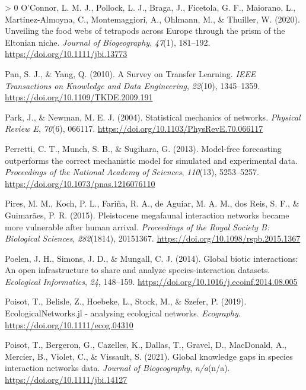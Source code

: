 \documentclass[10pt,oneside]{article}
\newlength{\cslhangindent}
\newenvironment{CSLReferences}[3] %
 {%
  \setlength{\parindent}{0pt}
  \ifodd #1 \everypar{\setlength{\hangindent}{\cslhangindent}}\ignorespaces\fi
  \ifnum #2 > 0
  \setlength{\parskip}{#2\baselineskip}
  \fi
 }%
 {}
\begin{document}
\begin{CSLReferences}{1}{0}
\leavevmode\hypertarget{ref-OConnor2020UnvFoo}{}%
O'Connor, L. M. J., Pollock, L. J., Braga, J., Ficetola, G. F.,
Maiorano, L., Martinez-Almoyna, C., Montemaggiori, A., Ohlmann, M., \&
Thuiller, W. (2020). Unveiling the food webs of tetrapods across Europe
through the prism of the Eltonian niche. \emph{Journal of Biogeography},
\emph{47}(1), 181--192. \url{https://doi.org/10.1111/jbi.13773}

\leavevmode\hypertarget{ref-Pan2010SurTra}{}%
Pan, S. J., \& Yang, Q. (2010). A Survey on Transfer Learning.
\emph{IEEE Transactions on Knowledge and Data Engineering},
\emph{22}(10), 1345--1359. \url{https://doi.org/10.1109/TKDE.2009.191}

\leavevmode\hypertarget{ref-Park2004StaMec}{}%
Park, J., \& Newman, M. E. J. (2004). Statistical mechanics of networks.
\emph{Physical Review E}, \emph{70}(6), 066117.
\url{https://doi.org/10.1103/PhysRevE.70.066117}

\leavevmode\hypertarget{ref-Perretti2013ModFor}{}%
Perretti, C. T., Munch, S. B., \& Sugihara, G. (2013). Model-free
forecasting outperforms the correct mechanistic model for simulated and
experimental data. \emph{Proceedings of the National Academy of
Sciences}, \emph{110}(13), 5253--5257.
\url{https://doi.org/10.1073/pnas.1216076110}

\leavevmode\hypertarget{ref-Pires2015PleMeg}{}%
Pires, M. M., Koch, P. L., Fariña, R. A., de Aguiar, M. A. M., dos Reis,
S. F., \& Guimarães, P. R. (2015). Pleistocene megafaunal interaction
networks became more vulnerable after human arrival. \emph{Proceedings
of the Royal Society B: Biological Sciences}, \emph{282}(1814),
20151367. \url{https://doi.org/10.1098/rspb.2015.1367}

\leavevmode\hypertarget{ref-Poelen2014GloBio}{}%
Poelen, J. H., Simons, J. D., \& Mungall, C. J. (2014). Global biotic
interactions: An open infrastructure to share and analyze
species-interaction datasets. \emph{Ecological Informatics}, \emph{24},
148--159. \url{https://doi.org/10.1016/j.ecoinf.2014.08.005}

\leavevmode\hypertarget{ref-Poisot2019EcoJl}{}%
Poisot, T., Belisle, Z., Hoebeke, L., Stock, M., \& Szefer, P. (2019).
EcologicalNetworks.jl - analysing ecological networks. \emph{Ecography}.
\url{https://doi.org/10.1111/ecog.04310}

\leavevmode\hypertarget{ref-Poisot2021GloKno}{}%
Poisot, T., Bergeron, G., Cazelles, K., Dallas, T., Gravel, D.,
MacDonald, A., Mercier, B., Violet, C., \& Vissault, S. (2021). Global
knowledge gaps in species interaction networks data. \emph{Journal of
Biogeography}, \emph{n/a}(n/a). \url{https://doi.org/10.1111/jbi.14127}


\end{CSLReferences}
\end{document}
